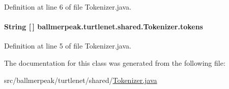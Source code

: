 Definition at line 6 of file Tokenizer.\-java.

\hypertarget{classballmerpeak_1_1turtlenet_1_1shared_1_1Tokenizer_a776a32b36d0990c7008b7ae2084ff178}{
\paragraph[{tokens}]{\setlength{\rightskip}{0pt plus 5cm}String \mbox{[}$\,$\mbox{]} ballmerpeak.\-turtlenet.\-shared.\-Tokenizer.\-tokens\hspace{0.3cm}{\ttfamily [package]}}}\label{classballmerpeak_1_1turtlenet_1_1shared_1_1Tokenizer_a776a32b36d0990c7008b7ae2084ff178}


Definition at line 5 of file Tokenizer.\-java.



The documentation for this class was generated from the following file\-:\begin{DoxyCompactItemize}
\item 
src/ballmerpeak/turtlenet/shared/\hyperlink{Tokenizer_8java}{Tokenizer.\-java}\end{DoxyCompactItemize}
